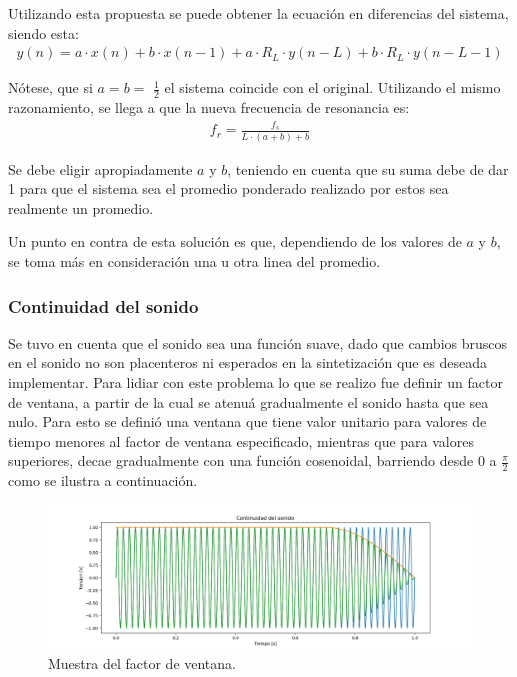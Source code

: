 Utilizando esta propuesta se puede obtener la ecuación en diferencias del sistema, siendo esta:
\begin{align}
y(n) = a\cdot x(n) +b\cdot x(n-1) + a\cdot R_L \cdot y(n-L)+b\cdot R_L \cdot y(n-L-1) 
\end{align}

Nótese, que si $a=b=$ $\frac{1}{2}$ el sistema coincide con el original. Utilizando el mismo razonamiento, se llega a que la nueva frecuencia de resonancia es:
\begin{align}
f_r=\frac{f_s}{L\cdot (a+b)+b}
\end{align}

Se debe eligir apropiadamente $a$ y $b$, teniendo en cuenta que su suma debe de dar 1 para que el sistema sea el promedio ponderado realizado por estos sea realmente un promedio.

Un punto en contra de esta solución es que, dependiendo de los valores de $a$ y $b$, se toma más en consideración una u otra linea del promedio.

\subsubsection{Continuidad del sonido}
Se tuvo en cuenta que el sonido sea una función suave, dado que cambios bruscos en el sonido no son placenteros ni esperados en la sintetización que es deseada implementar. Para lidiar con este problema lo que se realizo fue definir un factor de ventana, a partir de la cual se atenuá gradualmente el sonido hasta que sea nulo. Para esto se definió una ventana que tiene valor unitario para valores de tiempo menores al factor de ventana especificado, mientras que para valores superiores, decae gradualmente con una función cosenoidal, barriendo desde 0 a $\frac{\pi}{2}$ como se ilustra a continuación.
\begin{figure}[H]
	\centering
	\includegraphics[width=1\textwidth]{ImagenesEjercicio4/continuidad.PNG}
	\caption{Muestra del factor de ventana.}
	\label{fig:windowfactor}
\end{figure}

